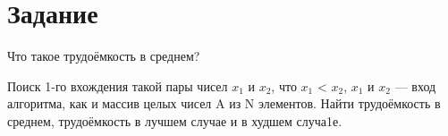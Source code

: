 \chapter*{Задание}

Что такое трудоёмкость в среднем? 

Поиск 1-го вхождения такой пары чисел $x_{1}$ и $x_{2}$, что $x_{1}$ < $x_{2}$, $x_{1}$ и $x_{2}$ --- вход алгоритма, как и массив целых чисел A из N элементов. Найти трудоёмкость в среднем, трудоёмкость в лучшем случае и в худшем случа1е. 